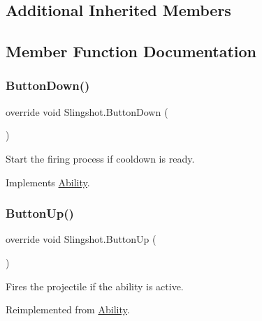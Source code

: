 \subsection*{Additional Inherited Members}


\subsection{Member Function Documentation}
\hypertarget{class_slingshot_a99edcb4d23f3b610620256ed5da498e5}{}\label{class_slingshot_a99edcb4d23f3b610620256ed5da498e5} 
\subsubsection{\texorpdfstring{Button\+Down()}{ButtonDown()}}
{\footnotesize\ttfamily override void Slingshot.\+Button\+Down (\begin{DoxyParamCaption}{ }\end{DoxyParamCaption})\hspace{0.3cm}{\ttfamily [virtual]}}



Start the firing process if cooldown is ready. 



Implements \hyperlink{class_ability_a7722265862f8b29828315725415ce266}{Ability}.

\hypertarget{class_slingshot_a6d052ffbe09939626984fb9af095be54}{}\label{class_slingshot_a6d052ffbe09939626984fb9af095be54} 
\subsubsection{\texorpdfstring{Button\+Up()}{ButtonUp()}}
{\footnotesize\ttfamily override void Slingshot.\+Button\+Up (\begin{DoxyParamCaption}{ }\end{DoxyParamCaption})\hspace{0.3cm}{\ttfamily [virtual]}}



Fires the projectile if the ability is active. 



Reimplemented from \hyperlink{class_ability_ad13b45ac8d2205494b2c12d16677fe26}{Ability}.

\hypertarget{class_slingshot_a53b90ca543630d2a799da52e0ba7684c}{}\label{class_slingshot_a53b90ca543630d2a799da52e0ba7684c} 
